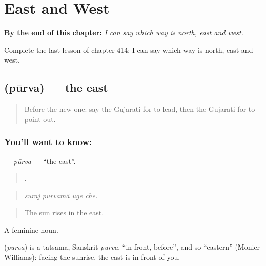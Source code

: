 
\chapter{East and West}
\label{ch:gu-east-and-west}

\begin{chapteropening}
\textbf{By the end of this chapter:} \emph{I can say which way is north, east and west.}

Complete the last lesson of chapter 414: I can say which way is north, east and west.
\end{chapteropening}

\section[\texorpdfstring{\gu{પૂર્વ} (pūrva)}{પૂર્વ (pūrva)}]{ (pūrva) — the east}

\label{lesson:GU-C414-purva}



\begin{quote}
Before the new one: say the Gujarati for to lead, then the Gujarati for to point out.
\end{quote}

\subsection*{You'll want to know: }
\textbf{} — \emph{pūrva} — \textquotedblleft{}the east\textquotedblright{}.

\begin{quote}
   .
\end{quote}

\begin{quote}
\emph{sūraj pūrvamā̃ ūge che.}
\end{quote}

\begin{quote}
The sun rises in the east.
\end{quote}

A feminine noun.

\begin{cousinweb}
\textbf{} (\emph{pūrva}) is a tatsama, Sanskrit \emph{pūrva}, \textquotedblleft{}in front, before\textquotedblright{}, and so \textquotedblleft{}eastern\textquotedblright{} (Monier-Williams): facing the sunrise, the east is in front of you.
\end{cousinweb}

